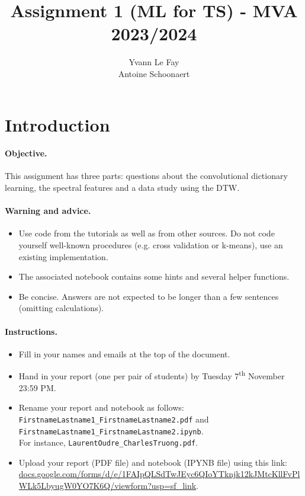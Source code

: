 \documentclass[11pt]{article}
\title{Assignment 1 (ML for TS) - MVA 2023/2024}
\author{
Yvann Le Fay \email{yvann.lefay@ensae.fr} \\ %
Antoine Schoonaert \email{antoine.schoonaert@etu.emse.fr} %
}
\begin{document}
\maketitle

\section{Introduction}

\paragraph{Objective.} This assignment has three parts: questions about the convolutional dictionary learning, the spectral features and a data study using the DTW.

\paragraph{Warning and advice.}
\begin{itemize}
    \item Use code from the tutorials as well as from other sources. Do not code yourself well-known procedures (e.g. cross validation or k-means), use an existing implementation.
    \item The associated notebook contains some hints and several helper functions.
    \item Be concise. Answers are not expected to be longer than a few sentences (omitting calculations).
\end{itemize}



\paragraph{Instructions.}
\begin{itemize}
    \item Fill in your names and emails at the top of the document.
    \item Hand in your report (one per pair of students) by Tuesday 7\textsuperscript{th} November 23:59 PM.
    \item Rename your report and notebook as follows:\\ \texttt{FirstnameLastname1\_FirstnameLastname2.pdf} and\\ \texttt{FirstnameLastname1\_FirstnameLastname2.ipynb}.\\
    For instance, \texttt{LaurentOudre\_CharlesTruong.pdf}.
    \item Upload your report (PDF file) and notebook (IPYNB file) using this link: \footnotesize{\href{https://docs.google.com/forms/d/e/1FAIpQLSdTwJEyc6QIoYTknjk12kJMtcKllFvPlWLk5LbyugW0YO7K6Q/viewform?usp=sf_link}{docs.google.com/forms/d/e/1FAIpQLSdTwJEyc6QIoYTknjk12kJMtcKllFvPlWLk5LbyugW0YO7K6Q/viewform?usp=sf\_link}}.
\end{itemize}
\end{document}
